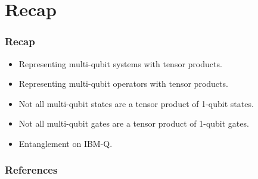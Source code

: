 \documentclass{beamer}
\theoremstyle{definition}
\begin{document}
\section{Recap}

\begin{frame}
\frametitle{Recap}

\begin{itemize}
	\item Representing multi-qubit systems with tensor products.
	\item Representing multi-qubit operators with tensor products.
	\item Not all multi-qubit states are a tensor product of 1-qubit states.
	\item Not all multi-qubit gates are a tensor product of 1-qubit gates.
	\item Entanglement on IBM-Q.
\end{itemize}

\end{frame}

\begin{frame}
\frametitle{References}




{}



\end{frame}



 
\end{document}
